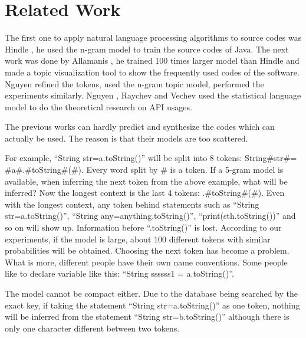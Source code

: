 \documentclass{sig-alternate-05-2015}
\begin{document}

\vspace{-0.2cm}
\section{Related Work}

The first one to apply natural language processing algorithms to source codes was Hindle \cite{DBLP:conf/icse/HindleBSGD12}, he used the n-gram \cite{cavnar1994n} model to train the source codes of Java. The next work was done by Allamanis \cite{DBLP:conf/msr/AllamanisS13a}, he trained 100 times larger model than Hindle and made a topic visualization tool to show the frequently used codes of the software. Nguyen \cite{DBLP:conf/sigsoft/NguyenNNN13} refined the tokens, used the n-gram topic \cite{wang2007topical} model, performed the experiments similarly. Nguyen \cite{DBLP:conf/icse/NguyenN15}, Raychev and Vechev \cite{DBLP:conf/pldi/RaychevVY14} used the statistical language model to do the theoretical research on API usages.

The previous works can hardly predict and synthesize the codes which can actually be used. The reason is that their models are too scattered.

For example, ``String str=a.toString()'' will be split into 8 tokens: String$\#$str$\#$=$\#$a$\#$.$\#$toString$\#$($\#$). Every word split by $\#$ is a token. If a 5-gram model is available, when inferring the next token from the above example, what will be inferred? Now the longest context is the last 4 tokens: .\#toString\#(\#). Even with the longest context, any token behind statements such as ``String str=a.toString()'', ``String any=anything.toString()'', ``print(sth.toString())'' and so on will show up. Information before ``.toString()'' is lost. According to our experiments, if the model is large, about 100 different tokens with similar probabilities will be obtained. Choosing the next token has become a problem. What is more, different people have their own name conventions. Some people like to declare variable like this: ``String ssssss1 = a.toString()''.

The model cannot be compact either. Due to the database being searched by the exact key, if taking the statement ``String str=a.toString()'' as one token, nothing will be inferred from the statement ``String str=b.toString()'' although there is only one character different between two tokens.
\end{document}
